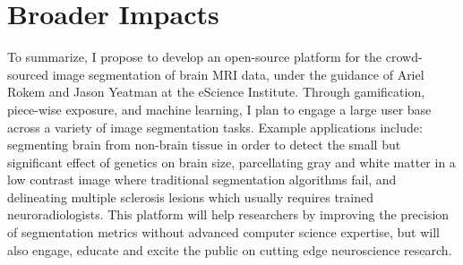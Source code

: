 \section*{Broader Impacts}

To summarize, I propose to develop an open-source platform for the crowd-sourced image segmentation of brain MRI data, under the guidance of Ariel Rokem and Jason Yeatman at the eScience Institute. Through gamification, piece-wise exposure, and machine learning, I plan to engage a large user base across a variety of image segmentation tasks. Example applications include: segmenting brain from non-brain tissue in order to detect the small but significant effect of genetics on brain size, parcellating gray and white matter in a low contrast image where traditional segmentation algorithms fail, and delineating multiple sclerosis lesions which usually requires trained neuroradiologists. This platform will help researchers by improving the precision of segmentation metrics without advanced computer science expertise, but will also engage, educate and excite the public on cutting edge neuroscience research. 
